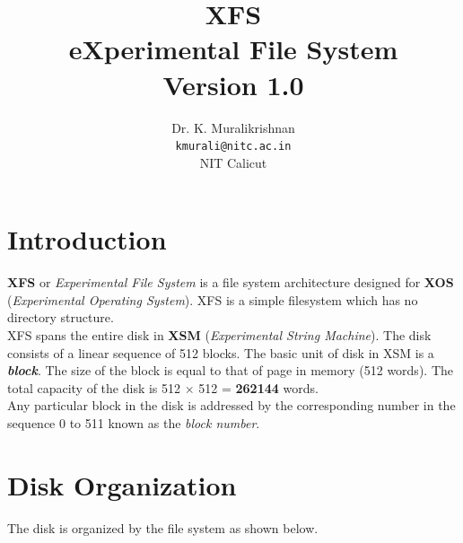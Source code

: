 \documentclass[11pt]{article}
\title{XFS \\ eXperimental File System \\
Version 1.0}
\author{Dr. K. Muralikrishnan  \\ \texttt{kmurali@nitc.ac.in} \\ {NIT Calicut} }
\begin{document}
\maketitle
\pagebreak

\thispagestyle{plain}

\tableofcontents
\pagebreak




\section{Introduction}
\textbf{XFS} or \textit{Experimental File System} is a file system architecture designed for \textbf{XOS} (\textit{Experimental Operating System}). XFS is a simple filesystem which has no directory structure. \\

XFS spans the entire disk in \textbf{XSM} (\textit{Experimental String Machine}). The disk consists of a linear sequence of 512 blocks. The basic unit of disk in XSM is a \textbf{\textit{block}}. The size of the block is equal to that of page in memory (512 words). The total capacity of the disk is 512 $\times$ 512 = \textbf{262144} words. \\

Any particular block in the disk is addressed by the corresponding number in the sequence 0 to 511 known as the \emph{block number}.





\section{Disk Organization}
The disk is organized by the file system as shown below. 
\end{document}
